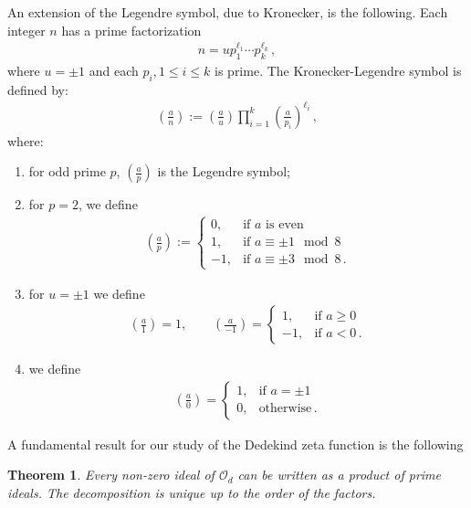 \documentclass[reqno]{amsart}
\theoremstyle{plain}
\newtheorem{theorem}{Theorem}[section]
\theoremstyle{definition}
\theoremstyle{remark}
\numberwithin{equation}{section}
\begin{document}
An extension of the Legendre symbol, due to Kronecker, is the
following. Each integer $n$ has a prime factorization
\begin{align*}
  n = u p_1^{\ell_1}\cdots p_k^{\ell_k}\,,
\end{align*}
where $u=\pm 1$ and each $p_i, 1\leq i\leq k$ is prime. The
Kronecker-Legendre symbol is defined by:
\begin{align*}
  \left(\frac{a}{n}\right) := \left(\frac{a}{u}\right)
  \prod_{i=1}^k \left(\frac{a}{p_i}\right)^{\ell_i}\,,
\end{align*}
where:
\begin{enumerate}
\item for odd prime $p$, $\displaystyle\left(\frac{a}{p}\right)$
  is the Legendre symbol;
\item for $p=2$, we define
  \begin{align*}
      \left(\frac{a}{p}\right) :=\left\{
        \begin{array}{ll}
          0, & \text{if } a \text{ is even}\\
          1, & \text{if } a \equiv\pm 1\mod 8\\
          -1, & \text{if } a \equiv \pm 3\mod 8 \,.
        \end{array}\right.
    \end{align*}
\item for $u=\pm 1$ we define
  \begin{align*}
    \left(\frac{a}{1}\right)=1,\qquad
    \left(\frac{a}{-1}\right)=\left\{
        \begin{array}{ll}
          1, & \text{if } a \geq 0\\
          -1, & \text{if } a < 0\,.
        \end{array}\right.
  \end{align*}
\item we define
  \begin{align*}
    \left(\frac{a}{0}\right)=\left\{
        \begin{array}{ll}
          1, & \text{if } a =\pm 1\\
          0, & \text{otherwise}\,.
        \end{array}\right.
  \end{align*}
\end{enumerate}

A fundamental result for our study of the Dedekind zeta function is
the following
\begin{theorem}
  Every non-zero ideal of ${{\mathcal O}}_d$ can be written as a product of
  prime ideals. The decomposition is unique up to the order of the
  factors.
\end{theorem}
\end{document}
